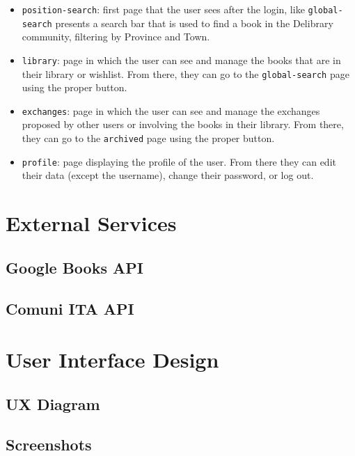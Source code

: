 \begin{itemize}
    \item \texttt{position-search}:
          first page that the user sees after the login, like \texttt{global-search} presents a search bar that is used to find a book
          in the Delibrary community, filtering by Province and Town.
    \item \texttt{library}:
          page in which the user can see and manage the books that are in their library or wishlist.
          From there, they can go to the \texttt{global-search} page using the proper button.
    \item \texttt{exchanges}:
          page in which the user can see and manage the exchanges proposed by other users or involving the books in their library.
          From there, they can go to the \texttt{archived} page using the proper button.
    \item \texttt{profile}:
          page displaying the profile of the user. From there they can edit their data (except the username), change their password, or log out.
\end{itemize}

\chapter{External Services}

\section{Google Books API}

\section{Comuni ITA API}



\chapter{User Interface Design}

\section{UX Diagram}

\section{Screenshots}



